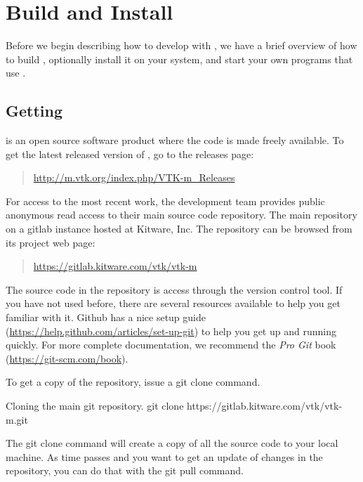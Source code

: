 
\chapter{Build and Install \VTKm}
\label{chap:BuildAndInstall}

Before we begin describing how to develop with \VTKm, we have a brief overview of how to build \VTKm, optionally install it on your system, and start your own programs that use \VTKm.


\section{Getting \VTKm}

\VTKm is an open source software product where the code is made freely available.
To get the latest released version of \VTKm, go to the \VTKm releases page:

\begin{quote}
  \url{http://m.vtk.org/index.php/VTK-m_Releases}
\end{quote}

For access to the most recent work, the \VTKm development team provides public anonymous read access to their main source code repository.
The main \VTKm repository on a gitlab instance hosted at Kitware, Inc.
The repository can be browsed from its project web page:

\begin{quote}
  \url{https://gitlab.kitware.com/vtk/vtk-m}
\end{quote}


The source code in the \VTKm repository is access through the  version control tool.
If you have not used  before, there are several resources available to help you get familiar with it.
Github has a nice setup guide (\url{https://help.github.com/articles/set-up-git}) to help you get up and running quickly.
For more complete documentation, we recommend the \emph{Pro Git} book (\url{https://git-scm.com/book}).

To get a copy of the \VTKm repository, issue a git clone command.

\begin{blankexample}{Cloning the main \VTKm git repository.}
git clone https://gitlab.kitware.com/vtk/vtk-m.git
\end{blankexample}

The git clone command will create a copy of all the source code to your local machine.
As time passes and you want to get an update of changes in the repository, you can do that with the git pull command.

